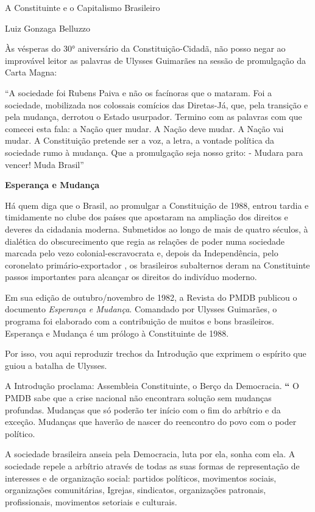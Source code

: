 A Constituinte e o Capitalismo Brasileiro

Luiz Gonzaga Belluzzo

Às vésperas do 30° aniversário da Constituição-Cidadã, não posso negar
ao improvável leitor as palavras de Ulysses Guimarães na sessão de
promulgação da Carta Magna:

``A sociedade foi Rubens Paiva e não os facínoras que o mataram. Foi a
sociedade, mobilizada nos colossais comícios das Diretas-Já, que, pela
transição e pela mudança, derrotou o Estado usurpador. Termino com as
palavras com que comecei esta fala: a Nação quer mudar. A Nação deve
mudar. A Nação vai mudar. A Constituição pretende ser a voz, a letra, a
vontade política da sociedade rumo à mudança. Que a promulgação seja
nosso grito: - Mudara para vencer! Muda Brasil''

\textbf{Esperança e Mudança}

Há quem diga que o Brasil, ao promulgar a Constituição de 1988, entrou
tardia e timidamente no clube dos países que apostaram na ampliação dos
direitos e deveres da cidadania moderna. Submetidos ao longo de mais de
quatro séculos, à dialética do obscurecimento que regia as relações de
poder numa sociedade marcada pelo vezo colonial-escravocrata e, depois
da Independência, pelo coronelato primário-exportador , os brasileiros
subalternos deram na Constituinte passos importantes para alcançar os
direitos do indivíduo moderno.

Em sua edição de outubro/novembro de 1982, a Revista do PMDB publicou o
documento \emph{Esperança e Mudança}. Comandado por Ulysses Guimarães, o
programa foi elaborado com a contribuição de muitos e bons brasileiros.
Esperança e Mudança é um prólogo à Constituinte de 1988.

Por isso, vou aqui reproduzir trechos da Introdução que exprimem o
espírito que guiou a batalha de Ulysses.

A Introdução proclama: Assembleia Constituinte, o Berço da Democracia.
\textbf{``} O PMDB sabe que a crise nacional não encontrara solução sem
mudanças profundas. Mudanças que só poderão ter início com o fim do
arbítrio e da exceção. Mudanças que haverão de nascer do reencontro do
povo com o poder político.

A sociedade brasileira anseia pela Democracia, luta por ela, sonha com
ela. A sociedade repele a arbítrio através de todas as suas formas de
representação de interesses e de organização social: partidos políticos,
movimentos sociais, organizações comunitárias, Igrejas, sindicatos,
organizações patronais, profissionais, movimentos setoriais e culturais.

